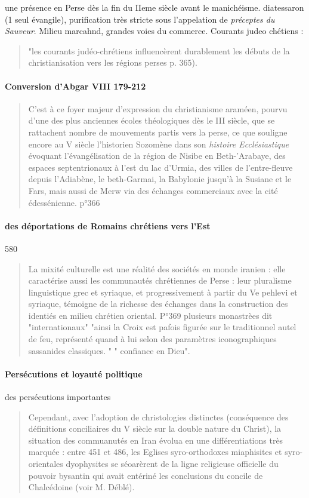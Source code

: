une présence en Perse dès la fin du IIeme siècle avant le manichéisme. 
diatessaron (1 seul évangile), purification très stricte sous l'appelation de \textit{préceptes du Sauveur}. 
Milieu marcahnd, grandes voies du commerce. 
Courants judeo chétiens : 
\begin{quote}
"les courants judéo-chrétiens influencèrent durablement les débuts de la christianisation vers les régions perses p. 365).
\end{quote}

\paragraph{Conversion d'Abgar VIII 179-212}
\begin{quote}
    C'est à ce foyer majeur d'expression du christianisme araméen, pourvu d'une des plus anciennes écoles théologiques dès le III siècle, que se rattachent nombre de mouvements partis vers la perse, ce que souligne encore au V siècle l'historien Sozomène dans son \textit{histoire Ecclésiastique} évoquant l'évangélisation de la région de Nisibe en Beth-'Arabaye, des espaces septentrionaux à l'est du lac d'Urmia, des villes de l'entre-fleuve depuis l'Adiabène, le beth-Garmai, la Babylonie jusqu'à la Susiane et le Fars, mais aussi de Merw via des échanges commerciaux avec la cité édessénienne. p°366
\end{quote}

\paragraph{des déportations de Romains chrétiens vers l'Est } 580

\begin{quote}
    La mixité culturelle est une réalité des sociétés en monde iranien : elle caractérise aussi les communautés chrétiennes de Perse : leur pluralisme linguistique grec et syriaque, et progressivement à partir du Ve pehlevi et syriaque, témoigne de la richesse des échanges dans la construction des identiés en milieu chrétien oriental. P°369
    plusieurs monastrèes dit "internationaux"
    "ainsi la Croix est pafois figurée sur le traditionnel autel de feu, représenté quand à lui selon des paramètres iconographiques sassanides classiques. "
    " confiance en Dieu".
\end{quote}
\paragraph{Persécutions et loyauté politique}
des persécutions importantes
\begin{quote}
    Cependant, avec l'adoption de christologies distinctes (conséquence des définitions conciliaires du V siècle sur la double nature du Christ), la situation des commuanutés en Iran évolua en une différentiations très marquée : entre 451 et 486, les Eglises syro-orthodoxes miaphisites et syro-orientales dyophysites se séoarèrent de la ligne religieuse officielle du pouvoir bysantin qui avait entériné les conclusions du concile de Chalcédoine (voir M. Déblé). 
\end{quote}

